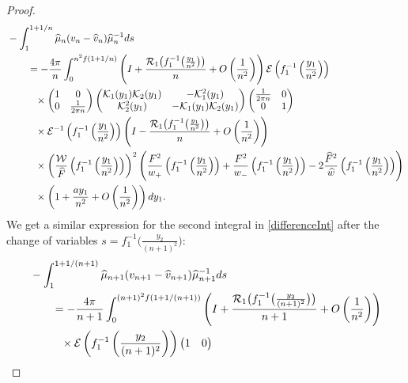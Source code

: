 \documentclass[11pt]{article}
\numberwithin{equation}{section}
\newcommand{\Id}{I}
\newcommand{\cK}{\mathcal{K}}
\newcommand{\cE}{\mathcal{E}}
\newcommand{\cR}{\mathcal{R}}
\newcommand{\cW}{\mathcal{W}}
\newcommand{\hw}{\widehat w}
\newcommand{\hmu}{{\widehat \mu}}
\newcommand{\bv}{v}
\newcommand{\hv}{{\widehat v}}
\newcommand{\hF}{\widehat F}
\newcommand{\hFw}{\frac{\hF^2}{\hw}}
\numberwithin{equation}{section}
\begin{document}
\begin{proof}
\begin{align}
 &-\int_1^{1+1/n} \hmu_n(\bv_n-\hv_n)\hmu_n^{-1} {\rm d}s\nonumber
 \\
 &\qquad=- \frac{4\pi}{n} \int_0^{n^2f(1+1/n)} \left( \Id + \frac{\cR_1\big(f_1^{-1}\big(\frac{y_1}{n^2}\big)\big)}{n}+ O\left( \frac{1}{n^2} \right)\right)\cE\left(f_1^{-1}\left(\frac{y_1}{n^2}\right)\right)\nonumber
 \\
 &\phantom{\qquad=}{}\times
 \begin{pmatrix}
 1 & 0
 \\
 0 & \frac{1}{2\pi n}
 \end{pmatrix}
 \begin{pmatrix}
 \cK_1(y_1)\cK_2(y_1) & -\cK^2_1(y_1)
 \\
 \cK^2_2(y_1) & -\cK_1(y_1)\cK_2(y_1)
 \end{pmatrix}
 \begin{pmatrix}
 \frac{1}{2\pi n} & 0
 \\
 0 & 1
 \end{pmatrix}\nonumber
 \\
 &\phantom{\qquad=}{}\times
\cE^{-1}\left(f_1^{-1}\left(\frac{y_1}{n^2}\right)\right)\left( \Id - \frac{\cR_1\big(f_1^{-1}\big(\frac{y_1}{n^2}\big)\big)}{n}+ O\left( \frac{1}{n^2} \right)\right)\nonumber
 \\
 &\phantom{\qquad=}{}\times
 \left(\frac{\cW}{\hF}\left(f_1^{-1}\left(\frac{y_1}{n^2}\right)\right)\right)^2\left(\frac{F^2}{w_+}\left(f_1^{-1}\left(\frac{y_1}{n^2}\right)\right)+\frac{F^2}{w_-}\left(f_1^{-1}\left(\frac{y_1}{n^2}\right)\right)-2\hFw\left(f_1^{-1}\left(\frac{y_1}{n^2}\right)\right)\right)\nonumber
 \\
 &\phantom{\qquad=}{}\times \left(1 + \frac{ay_1}{n^2} + O\left(\frac{1}{n^2}\right)\right){\rm d}y_1.\label{LongExp1}
\end{align}
We get a similar expression for the second integral in \eqref{differenceInt} after the change of variables $s = f_1^{-1}\big(\frac{y_2}{(n+1)^2}\big)$:
\begin{align}
&-\int_1^{1+1/(n+1)} \hmu_{n+1}(\bv_{n+1}-\hv_{n+1})\hmu_{n+1}^{-1} {\rm d}s\nonumber
 \\
 &\qquad=- \frac{4\pi}{n+1} \int_0^{(n+1)^2f(1+1/(n+1))} \left( \Id + \frac{\cR_1\big(f_1^{-1}\big(\frac{y_2}{(n+1)^2}\big)\big)}{n+1}+ O\left( \frac{1}{n^2} \right)\right)\nonumber
 \\
 &\phantom{\qquad=}{}\times\cE\left(f_1^{-1}\left(\frac{y_2}{(n+1)^2}\right)\right)
 \begin{pmatrix}
 1 & 0
 \\

\end{pmatrix}
\end{align}
\end{proof}
\end{document}
